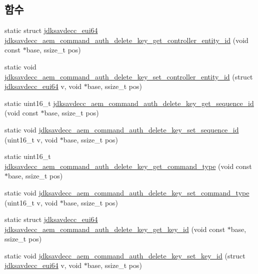 \subsection*{함수}
\begin{DoxyCompactItemize}
\item 
static struct \hyperlink{structjdksavdecc__eui64}{jdksavdecc\+\_\+eui64} \hyperlink{group__command__auth__delete__key_gae68e1fbe25c4092b88dc784f18c15fdd}{jdksavdecc\+\_\+aem\+\_\+command\+\_\+auth\+\_\+delete\+\_\+key\+\_\+get\+\_\+controller\+\_\+entity\+\_\+id} (void const $\ast$base, ssize\+\_\+t pos)
\item 
static void \hyperlink{group__command__auth__delete__key_gad66b2f825d268fb931c954fe40ea93ff}{jdksavdecc\+\_\+aem\+\_\+command\+\_\+auth\+\_\+delete\+\_\+key\+\_\+set\+\_\+controller\+\_\+entity\+\_\+id} (struct \hyperlink{structjdksavdecc__eui64}{jdksavdecc\+\_\+eui64} v, void $\ast$base, ssize\+\_\+t pos)
\item 
static uint16\+\_\+t \hyperlink{group__command__auth__delete__key_gac6971edfd4afe9ac77c86ddef19aba00}{jdksavdecc\+\_\+aem\+\_\+command\+\_\+auth\+\_\+delete\+\_\+key\+\_\+get\+\_\+sequence\+\_\+id} (void const $\ast$base, ssize\+\_\+t pos)
\item 
static void \hyperlink{group__command__auth__delete__key_ga4e47df401de7d94c5447477fa6d7b45f}{jdksavdecc\+\_\+aem\+\_\+command\+\_\+auth\+\_\+delete\+\_\+key\+\_\+set\+\_\+sequence\+\_\+id} (uint16\+\_\+t v, void $\ast$base, ssize\+\_\+t pos)
\item 
static uint16\+\_\+t \hyperlink{group__command__auth__delete__key_ga395e409c7953ec290b9cf2d36ef309d0}{jdksavdecc\+\_\+aem\+\_\+command\+\_\+auth\+\_\+delete\+\_\+key\+\_\+get\+\_\+command\+\_\+type} (void const $\ast$base, ssize\+\_\+t pos)
\item 
static void \hyperlink{group__command__auth__delete__key_ga54806b73476476c46c3f3ce48323c162}{jdksavdecc\+\_\+aem\+\_\+command\+\_\+auth\+\_\+delete\+\_\+key\+\_\+set\+\_\+command\+\_\+type} (uint16\+\_\+t v, void $\ast$base, ssize\+\_\+t pos)
\item 
static struct \hyperlink{structjdksavdecc__eui64}{jdksavdecc\+\_\+eui64} \hyperlink{group__command__auth__delete__key_ga1e3fbeba2601084ac4105dec73835133}{jdksavdecc\+\_\+aem\+\_\+command\+\_\+auth\+\_\+delete\+\_\+key\+\_\+get\+\_\+key\+\_\+id} (void const $\ast$base, ssize\+\_\+t pos)
\item 
static void \hyperlink{group__command__auth__delete__key_ga92f2bccb6506efcdd367650dab9c4915}{jdksavdecc\+\_\+aem\+\_\+command\+\_\+auth\+\_\+delete\+\_\+key\+\_\+set\+\_\+key\+\_\+id} (struct \hyperlink{structjdksavdecc__eui64}{jdksavdecc\+\_\+eui64} v, void $\ast$base, ssize\+\_\+t pos)

\end{DoxyCompactItemize}
